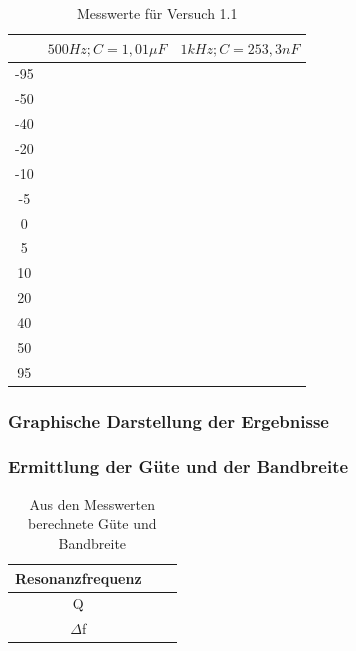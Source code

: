 \documentclass{article}
\begin{document}
\begin{table}[h]
  \begin{center}

    \begin{tabular}{|c|c|c|}
      \hline
          & $500Hz; C=1,01\mu F$ & $1kHz; C= 253,3 nF$ \\
      \hline
      -95 &                      &                     \\
      \hline
      -50 &                      &                     \\
      \hline
      -40 &                      &                     \\
      \hline
      -20 &                      &                     \\
      \hline
      -10 &                      &                     \\
      \hline
      -5  &                      &                     \\
      \hline
      0   &                      &                     \\
      \hline
      5   &                      &                     \\
      \hline
      10  &                      &                     \\
      \hline
      20  &                      &                     \\
      \hline
      40  &                      &                     \\
      \hline
      50  &                      &                     \\
      \hline
      95  &                      &                     \\
      \hline
    \end{tabular}
    \caption{Messwerte für Versuch 1.1}
    \label{tab:MV}
  \end{center}
\end{table}

\subsubsection{Graphische Darstellung der Ergebnisse}

\subsubsection{Ermittlung der Güte und der Bandbreite}

\begin{table}[h]
  \begin{center}
    \begin{tabular}{|c|c|c|}
      \hline
      Resonanzfrequenz &  & \\
      \hline
      Q                &  & \\
      \hline
      $\Delta$f        &  & \\
      \hline
    \end{tabular}
    \caption{Aus den Messwerten berechnete Güte und Bandbreite}
    \label{tab:eMGB}
  \end{center}
\end{table}
\newpage
\end{document}
